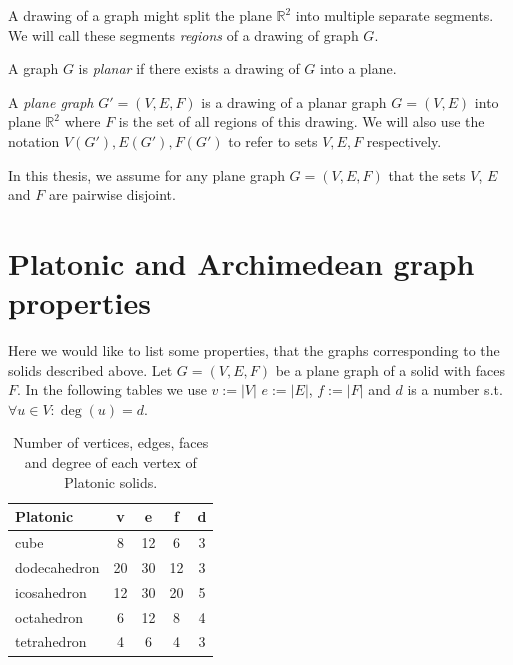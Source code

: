 A drawing of a graph might split the plane $\mathbb{R}^2$ into multiple separate segments. We will call these segments \textit{regions} of a drawing of graph $G$.

\begin{definition}
    A graph $G$ is \textit{planar} if there exists a drawing of $G$ into a plane.
\end{definition}

\begin{definition}
    A \textit{plane graph} $G' = (V,E,F)$ is a drawing of a planar graph $G=(V,E)$ into plane $\mathbb{R}^2$ where $F$ is the set of all regions of this drawing. We will also use the notation $V(G'), E(G'), F(G')$ to refer to sets $V,E,F$ respectively.
\end{definition}

In this thesis, we assume for any plane graph $G=(V,E,F)$ that the sets $V$, $E$ and $F$ are pairwise disjoint.


\section{Platonic and Archimedean graph properties}

Here we would like to list some properties, that the graphs corresponding to the solids described above. Let $G=(V,E,F)$ be a plane graph of a solid with faces $F$. In the following tables we use $v := |V|$ $e := |E|$, $f := |F|$ and $d$ is a number s.t. $\forall u \in V : \deg(u) = d$.

\vspace{5pt}

\begin{table}[H]
\centering
\caption{Number of vertices, edges, faces and degree of each vertex of Platonic solids.}
\vspace{5pt}
\label{tab:platonic-basic-props}
\begin{tabular}{|l|c|c|c|c|}
\hline
Platonic & v & e & f & d \\
\hline\hline
cube & 8 & 12 & 6 & 3 \\
\hline
dodecahedron & 20 & 30 & 12 & 3 \\
\hline
icosahedron & 12 & 30 & 20 & 5 \\
\hline
octahedron & 6 & 12 & 8 & 4 \\
\hline
tetrahedron & 4 & 6 & 4 & 3 \\
\hline
\end{tabular}
\end{table}


